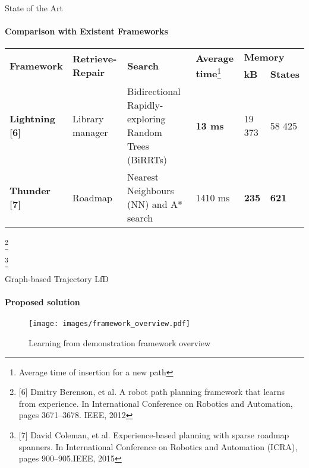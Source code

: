 \documentclass[aspectratio=169]{beamer}
\newcommand\blfootnote[1]{%
	\begingroup
	\renewcommand\thefootnote{}\footnote{#1}%
	\addtocounter{footnote}{-1}%
	\endgroup
}
\begin{document}
\begin{frame}{State of the Art}
	\framesubtitle{Comparison with Existent Frameworks}
	\vspace{-0.5cm}
	\begin{table}[!b]
		\small
		\begin{tabular}{||m{1.7cm}|m{2.5cm}|m{2.9cm}|m{2.2cm}|m{1cm}|m{1cm}||}
			\hline
			\multirow{2}{*}{\textbf{Framework}} & \multirow{2}{*}{\textbf{Retrieve-Repair}} & \multirow{2}{*}{\textbf{Search}}  & \multirow{2}{*}{\textbf{Average time}\footnote{Average time of insertion for a new path}} & \multicolumn{2}{l||}{\textbf{Memory}} \\ \cline{5-6} 
			&      &      &      & \textbf{kB} & \textbf{States} \\ \hline \hline
			\textbf{Lightning [6]} & Library manager & Bidirectional Rapidly-exploring Random Trees (BiRRTs) & \textcolor{hbrsblue}{\textbf{13 ms}} & 19 373 & 58 425  \\ \hline
			\textbf{Thunder [7]} & Roadmap & Nearest Neighbours (NN) and A* search & 1410 ms & \textcolor{hbrsblue}{\textbf{235}} & \textcolor{hbrsblue}{\textbf{621}}  \\ \hline
		\end{tabular}
	\end{table}
\blfootnote{[6] Dmitry Berenson, et al. A robot path planning framework that learns from experience. In International Conference on Robotics and Automation, pages 3671–3678. IEEE, 2012}
\blfootnote{[7] David Coleman, et al. Experience-based planning with sparse roadmap spanners. In International Conference on Robotics and Automation (ICRA), pages 900–905.IEEE, 2015}
\end{frame}


\begin{frame}{Graph-based Trajectory LfD}
	\framesubtitle{Proposed solution}
	\begin{figure}[tp]
		\centering
		\texttt{[image: images/framework\_overview.pdf]}
		\vspace{-0.4cm}
		\caption{Learning from demonstration framework overview}
		\label{fig:framework_overview}
	\end{figure}
\end{frame}
\end{document}
